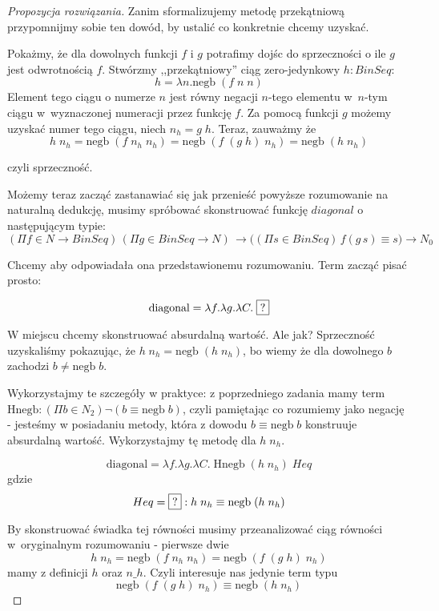\documentclass[10pt, a4paper]{article}
\begin{document}
\begin{proof}[Propozycja rozwiązania]
Zanim sformalizujemy metodę przekątniową przypomnijmy sobie ten dowód, by ustalić co konkretnie chcemy uzyskać.

Pokażmy, że dla dowolnych funkcji $f$ i $g$ potrafimy dojśc do sprzeczności o ile $g$ jest odwrotnością $f$.
Stwórzmy ,,przekątniowy'' ciąg zero-jedynkowy $h : BinSeq$:
\[
 h = \lambda n. \mbox{negb}\;(f\;n\;n)
\]
Element tego ciągu o numerze $n$ jest równy negacji $n$-tego elementu w~$n$-tym ciągu w~wyznaczonej numeracji
przez funkcję $f$. Za pomocą funkcji $g$ możemy uzyskać numer tego ciągu, niech $n_h = g\;h$. Teraz, zauważmy że
\[
h\;n_h = \mbox{negb}\;(f\;n_h\;n_h) = \mbox{negb}\;(f\;(g\;h)\;n_h) = \mbox{negb}\;(h \;n_h)
\]

czyli sprzeczność.


Możemy teraz zacząć zastanawiać się jak przenieść powyższe rozumowanie na naturalną dedukcję, musimy
spróbować skonstruować
funkcję $diagonal$ o następującym typie:
{
\small
\[
 (\Pi f \in N \to BinSeq)\, (\Pi g \in BinSeq \to N)\,
\to
\big(
(\Pi s \in BinSeq)\,f (g\, s) \equiv s 
\big)
\to N_0
\]
}

Chcemy aby odpowiadała ona przedstawionemu rozumowaniu. Term zacząć pisać prosto:

\[
  \mbox{diagonal} = \lambda f.\lambda g. \lambda C.\; \framebox{?}
\]

W miejscu  chcemy skonstruować absurdalną wartość. Ale jak? Sprzeczność uzyskaliśmy
pokazując, że $h\;n_h = \mbox{negb}\; (h\;n_h)$, bo wiemy że dla dowolnego $b$ zachodzi $b \not= \mbox{negb}\;b$.

Wykorzystajmy te szczegóły w praktyce: z poprzedniego zadania mamy term
$\mbox{Hnegb} : (\Pi b \in N_2) \neg (b \equiv \mbox{negb}\;b)$, czyli pamiętając co rozumiemy
jako negację - jesteśmy w posiadaniu metody, która z dowodu $b \equiv \mbox{negb}\;b$ konstruuje
absurdalną wartość. Wykorzystajmy tę metodę dla $h\;n_h$.

\[
  \mbox{diagonal} = \lambda f.\lambda g. \lambda C.\; \mbox{Hnegb}\; (h\;n_h)\; Heq
\]
gdzie
\[
 Heq = \framebox{?} : h\;n_h \equiv \mbox{negb}\; (h\;n_h)
\]

By skonstruować świadka tej równości musimy przeanalizować ciąg równości w~oryginalnym rozumowaniu - pierwsze dwie
\[
h\;n_h = \mbox{negb}\;(f\;n_h\;n_h) = \mbox{negb}\;(f\;(g\;h)\;n_h)
\]
mamy z definicji $h$ oraz $n\_h$. Czyli interesuje nas jedynie term typu
\[
\mbox{negb}\;(f\;(g\;h)\;n_h) \equiv \mbox{negb}\; (h\;n_h)
\]


\end{proof}
\end{document}
